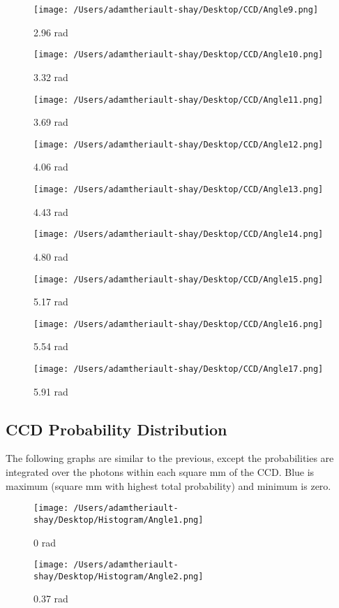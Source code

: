 \documentclass[11pt, oneside]{article}   	%
\begin{document}
\newpage
\begin{figure}
\texttt{[image: /Users/adamtheriault-shay/Desktop/CCD/Angle9.png]}
\caption{2.96 rad}
\texttt{[image: /Users/adamtheriault-shay/Desktop/CCD/Angle10.png]}
\caption{3.32 rad}
\end{figure}

\newpage
\begin{figure}
\texttt{[image: /Users/adamtheriault-shay/Desktop/CCD/Angle11.png]}
\caption{3.69 rad}
\texttt{[image: /Users/adamtheriault-shay/Desktop/CCD/Angle12.png]}
\caption{4.06 rad}
\end{figure}

\newpage
\begin{figure}
\texttt{[image: /Users/adamtheriault-shay/Desktop/CCD/Angle13.png]}
\caption{4.43 rad}
\texttt{[image: /Users/adamtheriault-shay/Desktop/CCD/Angle14.png]}
\caption{4.80 rad}
\end{figure}

\newpage
\begin{figure}
\texttt{[image: /Users/adamtheriault-shay/Desktop/CCD/Angle15.png]}
\caption{5.17 rad}
\texttt{[image: /Users/adamtheriault-shay/Desktop/CCD/Angle16.png]}
\caption{5.54 rad}
\end{figure}

\newpage
\begin{figure}
\texttt{[image: /Users/adamtheriault-shay/Desktop/CCD/Angle17.png]}
\caption{5.91 rad}
\end{figure}





\FloatBarrier







 \subsection{CCD Probability Distribution}
The following graphs are similar to the previous, except the probabilities are integrated over the photons within each square mm of the CCD.
Blue is maximum (square mm with highest total probability) and minimum is zero.

\begin{figure}
\centering
\texttt{[image: /Users/adamtheriault-shay/Desktop/Histogram/Angle1.png]}
\caption{0 rad}
\texttt{[image: /Users/adamtheriault-shay/Desktop/Histogram/Angle2.png]}
\caption{0.37 rad}
\end{figure}
\end{document}
